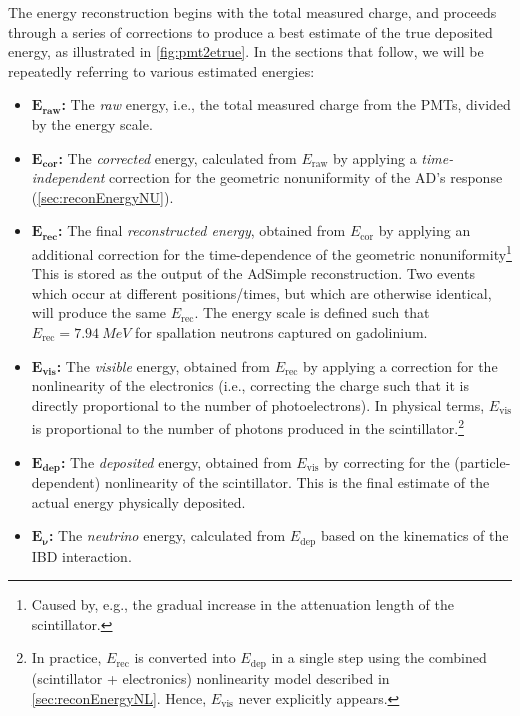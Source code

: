 \documentclass[../thesis.tex]{subfiles}
\begin{document}
The energy reconstruction begins with the total measured charge, and proceeds through a series of corrections to produce a best estimate of the true deposited energy, as illustrated in \autoref{fig:pmt2etrue}. In the sections that follow, we will be repeatedly referring to various estimated energies:
\begin{itemize}
\item $\mathbf{E_{raw}}$\textbf{:} The \emph{raw} energy, i.e., the total measured charge from the PMTs, divided by the energy scale.
\item $\mathbf{E_{cor}}$\textbf{:} The \emph{corrected} energy, calculated from $E_{\mathrm{raw}}$ by applying a \emph{time-independent} correction for the geometric nonuniformity of the AD's response (\autoref{sec:reconEnergyNU}).
\item $\mathbf{E_{rec}}$\textbf{:} The final \emph{reconstructed energy}, obtained from $E_{\mathrm{cor}}$ by applying an additional correction for the time-dependence of the geometric nonuniformity\footnote{Caused by, e.g., the gradual increase in the attenuation length of the scintillator.} This is stored as the output of the AdSimple reconstruction. Two events which occur at different positions/times, but which are otherwise identical, will produce the same $E_{\mathrm{rec}}$. The energy scale is defined such that $E_{\mathrm{rec}} = \SI{7.94}{MeV}$ for spallation neutrons captured on gadolinium.
\item $\mathbf{E_{vis}}$\textbf{:} The \emph{visible} energy, obtained from $E_{\mathrm{rec}}$ by applying a correction for the nonlinearity of the electronics (i.e., correcting the charge such that it is directly proportional to the number of photoelectrons). In physical terms, $E_{\mathrm{vis}}$ is proportional to the number of photons produced in the scintillator.\footnote{In practice, $E_{\mathrm{rec}}$ is converted into $E_{\mathrm{dep}}$ in a single step using the combined (scintillator + electronics) nonlinearity model described in \autoref{sec:reconEnergyNL}. Hence, $E_{\mathrm{vis}}$ never explicitly appears.}
\item $\mathbf{E_{dep}}$\textbf{:} The \emph{deposited} energy, obtained from $E_{\mathrm{vis}}$ by correcting for the (particle-dependent) nonlinearity of the scintillator. This is the final estimate of the actual energy physically deposited.
\item $\mathbf{E_{\nu}}$\textbf{:} The \emph{neutrino} energy, calculated from $E_{\mathrm{dep}}$ based on the kinematics of the IBD interaction.
\end{itemize}
\end{document}
